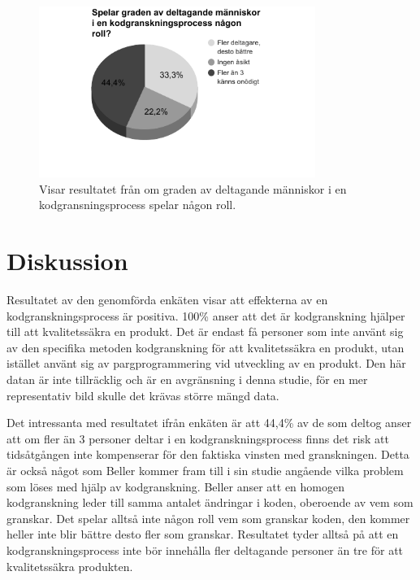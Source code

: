 \begin{figure}[H]
	\centering
	\includegraphics[width=90mm]{figures/grade_participation.png}
	\caption{Visar resultatet från om graden av deltagande människor i en kodgransningsprocess spelar någon roll.}
	\label{fig:grade_participation}
\end{figure}

\section{Diskussion}
\label{sec:discussion-wallstrom}
Resultatet av den genomförda enkäten visar att effekterna av en kodgranskningsprocess är positiva. 100\% anser att det är kodgranskning hjälper till att kvalitetssäkra en produkt. Det är endast få personer som inte använt sig av den specifika metoden kodgranskning för att kvalitetssäkra en produkt, utan istället använt sig av pargprogrammering vid utveckling av en produkt. Den här datan är inte tillräcklig och är en avgränsning i denna studie, för en mer representativ bild skulle det krävas större mängd data. 

Det intressanta med resultatet ifrån enkäten är att 44,4\% av de som deltog anser att om fler än 3 personer deltar i en kodgranskningsprocess finns det risk att tidsåtgången inte kompenserar för den faktiska vinsten med granskningen. Detta är också något som Beller \cite{beller2014modern} kommer fram till i sin studie angående vilka problem som löses med hjälp av kodgranskning. Beller anser att en homogen kodgranskning leder till samma antalet ändringar i koden, oberoende av vem som granskar. Det spelar alltså inte någon roll vem som granskar koden, den kommer heller inte blir bättre desto fler som granskar. Resultatet tyder alltså på att en kodgranskningsprocess inte bör innehålla fler deltagande personer än tre för att kvalitetssäkra produkten. 


